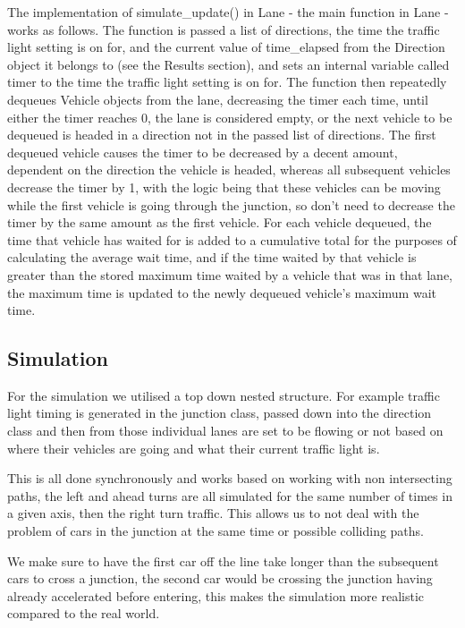 \documentclass{article}
\begin{document}
    The implementation of simulate_update() in Lane - the main function in Lane - works as follows. The function is passed a list of directions, 
    the time the traffic light setting is on for, and the current value of time_elapsed from the Direction object it belongs to (see the Results 
    section), and sets an internal variable called timer to the time the traffic light setting is on for. The function then repeatedly dequeues 
    Vehicle objects from the lane, decreasing the timer each time, until either the timer reaches 0, the lane is considered empty, or the next 
    vehicle to be dequeued is headed in a direction not in the passed list of directions. The first dequeued vehicle causes the timer to be decreased 
    by a decent amount, dependent on the direction the vehicle is headed, whereas all subsequent vehicles decrease the timer by 1, with the logic 
    being that these vehicles can be moving while the first vehicle is going through the junction, so don’t need to decrease the timer by the same 
    amount as the first vehicle. For each vehicle dequeued, the time that vehicle has waited for is added to a cumulative total for the purposes of 
    calculating the average wait time, and if the time waited by that vehicle is greater than the stored maximum time waited by a vehicle that was in 
    that lane, the maximum time is updated to the newly dequeued vehicle’s maximum wait time.


    \subsection{Simulation}

    For the simulation we utilised a top down nested structure. For example traffic light timing is generated in the
    junction class, passed down into the direction class and then from those individual lanes are set to be flowing
    or not based on where their vehicles are going and what their current traffic light is.

    This is all done synchronously and works based on working with non intersecting paths, the left and ahead turns are
    all simulated for the same number of times in a given axis, then the right turn traffic. This allows us to not deal
    with the problem of cars in the junction at the same time or possible colliding paths.

    We make sure to have the first car off the line take longer than the subsequent cars to cross a junction, the second
    car would be crossing the junction having already accelerated before entering, this makes the simulation more
    realistic compared to the real world.
\end{document}
